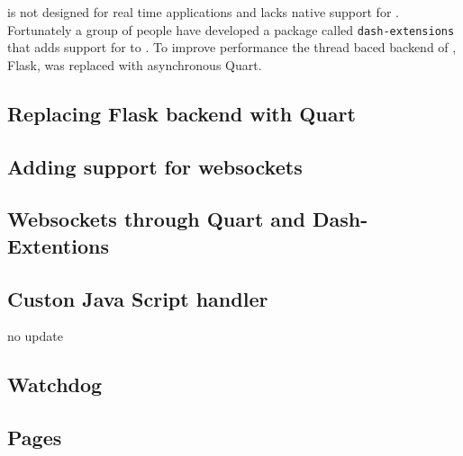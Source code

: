 \dash is not designed for real time applications and lacks native support for .
Fortunately a group of people have developed a package called \texttt{dash-extensions} that adds support for  to \dash \cite{eriksenDashExtensions}.
To improve performance the thread baced backend of \dash, Flask, was replaced with asynchronous Quart.

\subsection{Replacing Flask backend with Quart}

\subsection{Adding support for websockets}

\subsection{Websockets through Quart and Dash-Extentions}

\subsection{Custon Java Script handler}
no update

\subsection{Watchdog}


\subsection{Pages}
